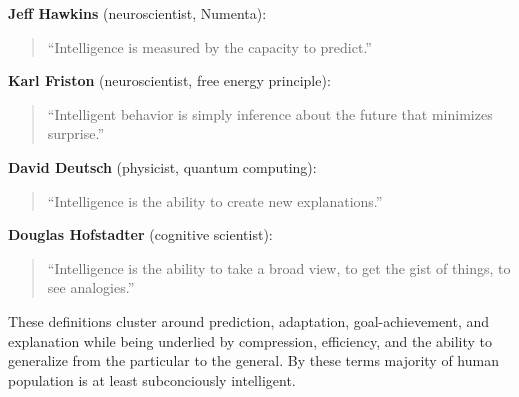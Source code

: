 \documentclass[11pt]{article}
\begin{document}
\textbf{Jeff Hawkins} (neuroscientist, Numenta):
\begin{quote}
``Intelligence is measured by the capacity to predict.''
\end{quote}

\textbf{Karl Friston} (neuroscientist, free energy principle):
\begin{quote}
``Intelligent behavior is simply inference about the future that minimizes surprise.''
\end{quote}

\textbf{David Deutsch} (physicist, quantum computing):
\begin{quote}
``Intelligence is the ability to create new explanations.''
\end{quote}

\textbf{Douglas Hofstadter} (cognitive scientist):
\begin{quote}
``Intelligence is the ability to take a broad view, to get the gist of things, to see analogies.''
\end{quote}

These definitions cluster around prediction, adaptation, goal-achievement, and explanation while being underlied by compression, efficiency, and the ability to generalize from the particular to the general. By these terms majority of human population is at least subconciously intelligent.
\end{document}
